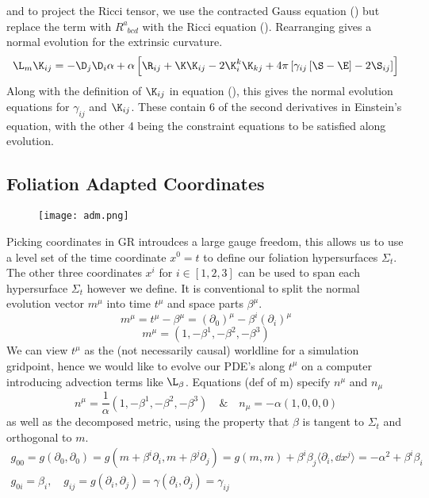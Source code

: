 and to project the Ricci tensor, we use the contracted Gauss equation () but replace the term with $R^a_{\,\,\,bcd}$ with the Ricci equation (). Rearranging gives a normal evolution for the extrinsic curvature.
\begin{equation} \L_m \K_{ij} = -\D_j\D_i \alpha + \alpha \left[ \R_{ij} + \K\K_{ij} - 2\K^k_i\K_{kj} + 4\pi \left[ \gamma_{ij}\left[ \S-\E\right]-2\S_{ij}\right]\right]\end{equation}
Along with the definition of $\K_{ij}$ in equation (), this gives the normal evolution equations for $\gamma_{ij}$ and $\K_{ij}$. These contain 6 of the second derivatives in Einstein's equation, with the other 4 being the constraint equations to be satisfied along evolution.

\subsection{Foliation Adapted Coordinates}
\begin{wrapfigure}{r}{0.65\textwidth}
    \texttt{[image: adm.png]}
\end{wrapfigure}
Picking coordinates in GR introudces a large gauge freedom, this allows us to use a level set of the time coordinate $x^0=t$ to define our foliation hypersurfaces $\Sigma_t$. The other three coordinates $x^i$ for $i\in[1,2,3]$ can be used to span each hypersurface $\Sigma_t$ however we define. It is conventional to split the normal evolution vector $m^\mu$ into time $t^\mu$ and space parts $\beta^\mu$.
\[ m^\mu = t^\mu - \beta^\mu  = (\partial_0)^\mu - \beta^i (\partial_i)^\mu \]
\[ m^\mu = \left( 1,-\beta^1,-\beta^2,-\beta^3\right) \]
We can view $t^\mu$ as the (not necessarily causal) worldline for a simulation gridpoint, hence we would like to evolve our PDE's along $t^\mu$ on a computer introducing advection terms like $\L_\beta$. Equations (def of m) specify $n^\mu$ and $n_\mu$
\begin{equation} n^\mu =  \frac{1}{\alpha}\left( 1,-\beta^1,-\beta^2,-\beta^3\right)\quad \& \quad n_\mu = -\alpha\left( 1,0,0,0\right)\end{equation}
as well as the decomposed metric, using the property that $\beta$ is tangent to $\Sigma_t$ and orthogonal to $m$.
\begin{gather} g_{00} = g(\partial_0,\partial_0) = g(m + \beta^i \partial_i,m + \beta^j\partial_j) = g(m,m) + \beta^i \beta_j \langle \partial_i,\dd x^j \rangle = -\alpha^2 + \beta^i \beta_i \nonumber\\
 g_{0i} = \beta_i,\quad
 g_{ij} = g(\partial_i,\partial_j) = \gamma(\partial_i,\partial_j) = \gamma_{ij}\nonumber\end{gather}
